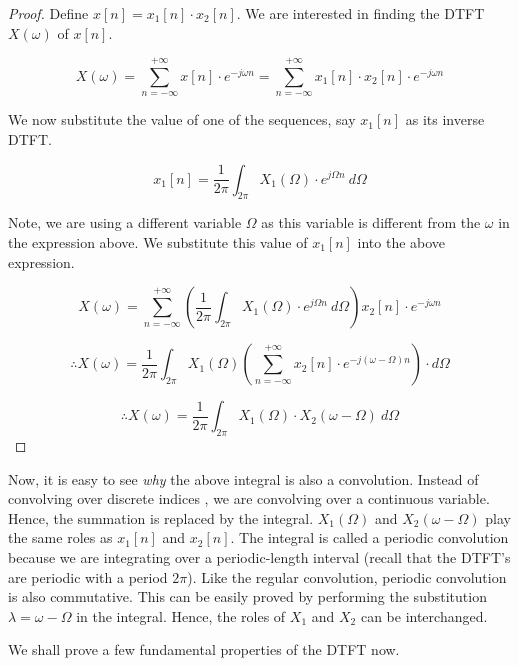 \documentclass{article}
\theoremstyle{definition}
\begin{document}
\begin{proof}
Define $x[n] = x_1[n] \cdot x_2[n]$. We are interested in finding the DTFT $X(\omega)$ of $x[n]$.

\[
	X(\omega) = \sum_{n=-\infty}^{+\infty} x[n] \cdot e^{-j\omega n} = \sum_{n=-\infty}^{+\infty} x_1[n] \cdot x_2[n] \cdot e^{-j\omega n}
\]

We now substitute the value of one of the sequences, say $x_1[n]$ as its inverse DTFT. 

\[
	x_1[n] = \frac{1}{2\pi} \int_{2\pi} X_1(\Omega) \cdot e^{j\Omega n} \: d\Omega 
\]

Note, we are using a different variable $\Omega$ as this variable is different from the $\omega$ in the expression above. We substitute this value of $x_1[n]$ into the above expression.

\[
	X(\omega) = \sum_{n=-\infty}^{+\infty} \left( \frac{1}{2\pi} \int_{2\pi} X_1(\Omega) \cdot e^{j\Omega n} \: d\Omega \right) x_2[n] \cdot e^{-j\omega n}
\]

\[
	\therefore X(\omega) = \frac{1}{2\pi} \int_{2\pi} X_1(\Omega) \left( \sum_{n=-\infty}^{+\infty} x_2[n] \cdot e^{-j(\omega - \Omega)n} \right) \cdot d\Omega 
\]

\[
	\therefore \boxed{X(\omega) = \frac{1}{2\pi} \int_{2\pi} X_1(\Omega) \cdot X_2(\omega - \Omega) \: d\Omega}
\]
\end{proof}

Now, it is easy to see \textit{why} the above integral is also a convolution. Instead of convolving over discrete indices , we are convolving over a continuous variable. Hence, the summation is replaced by the integral. $X_1(\Omega)$ and $X_2(\omega - \Omega)$ play the same roles as $x_1[n]$ and $x_2[n]$. The integral is called a periodic convolution because we are integrating over a periodic-length interval (recall that the DTFT's are periodic with a period $2\pi$). Like the regular convolution, periodic convolution is also commutative. This can be easily proved by performing the substitution $\lambda = \omega - \Omega$ in the integral. Hence, the roles of $X_1$ and $X_2$ can be interchanged. \smallskip

We shall prove a few fundamental properties of the DTFT now. 
\end{document}
